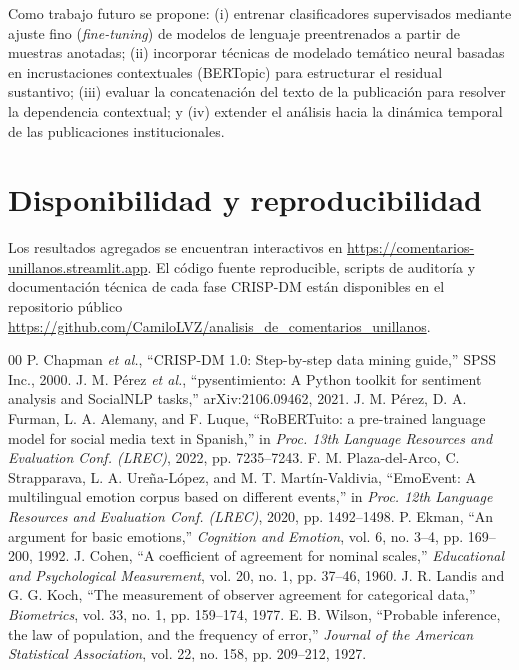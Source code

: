\documentclass[conference]{IEEEtran}
\begin{document}
Como trabajo futuro se propone: (i) entrenar clasificadores supervisados mediante ajuste fino (\emph{fine-tuning}) de modelos de lenguaje preentrenados a partir de muestras anotadas; (ii) incorporar t\'ecnicas de modelado tem\'atico neural basadas en incrustaciones contextuales (BERTopic) para estructurar el residual sustantivo; (iii) evaluar la concatenaci\'on del texto de la publicaci\'on para resolver la dependencia contextual; y (iv) extender el an\'alisis hacia la din\'amica temporal de las publicaciones institucionales.

\section*{Disponibilidad y reproducibilidad}
Los resultados agregados se encuentran interactivos en \url{https://comentarios-unillanos.streamlit.app}. El c\'odigo fuente reproducible, scripts de auditor\'ia y documentaci\'on t\'ecnica de cada fase CRISP-DM est\'an disponibles en el repositorio p\'ublico \url{https://github.com/CamiloLVZ/analisis_de_comentarios_unillanos}.

\begin{thebibliography}{00}
 P. Chapman \emph{et al.}, ``CRISP-DM 1.0: Step-by-step data mining guide,'' SPSS Inc., 2000.
 J. M. P\'erez \emph{et al.}, ``pysentimiento: A Python toolkit for sentiment analysis and SocialNLP tasks,'' arXiv:2106.09462, 2021.
 J. M. P\'erez, D. A. Furman, L. A. Alemany, and F. Luque, ``RoBERTuito: a pre-trained language model for social media text in Spanish,'' in \emph{Proc. 13th Language Resources and Evaluation Conf. (LREC)}, 2022, pp. 7235--7243.
 F. M. Plaza-del-Arco, C. Strapparava, L. A. Ure\~na-L\'opez, and M. T. Mart\'in-Valdivia, ``EmoEvent: A multilingual emotion corpus based on different events,'' in \emph{Proc. 12th Language Resources and Evaluation Conf. (LREC)}, 2020, pp. 1492--1498.
 P. Ekman, ``An argument for basic emotions,'' \emph{Cognition and Emotion}, vol. 6, no. 3--4, pp. 169--200, 1992.
 J. Cohen, ``A coefficient of agreement for nominal scales,'' \emph{Educational and Psychological Measurement}, vol. 20, no. 1, pp. 37--46, 1960.
 J. R. Landis and G. G. Koch, ``The measurement of observer agreement for categorical data,'' \emph{Biometrics}, vol. 33, no. 1, pp. 159--174, 1977.
 E. B. Wilson, ``Probable inference, the law of population, and the frequency of error,'' \emph{Journal of the American Statistical Association}, vol. 22, no. 158, pp. 209--212, 1927.
\end{thebibliography}
\end{document}
